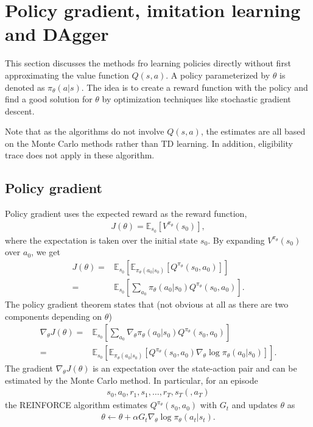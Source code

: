 \documentclass[onecolumn, 12pt]{IEEEtran}
\newcommand\EE[2]{\mathbb{E}_{#1}\left[#2\right]}
\newcommand\1[1]{\mathbb{I}_{\left\{#1\right\}}}
\begin{document}
\section{Policy gradient, imitation learning and DAgger}

This section discusses the methods fro learning policies directly without first approximating the value function $Q(s, a)$. A policy parameterized by $\theta$ is denoted as $\pi_\theta(a|s)$. The idea is to create a reward function with the policy and find a good solution for $\theta$ by optimization techniques like stochastic gradient descent.

Note that as the algorithms do not involve $Q(s, a)$, the estimates are all based on the Monte Carlo methods rather than TD learning. In addition, eligibility trace does not apply in these algorithm. 

\subsection{Policy gradient}

Policy gradient uses the expected reward as the reward function,
\begin{align*}
  J(\theta) = \EE{s_0}{V^{\pi_\theta}(s_0)},
\end{align*}
where the expectation is taken over the initial state $s_0$. By expanding $V^{\pi_\theta}(s_0)$ over $a_0$, we get
\begin{align*}
  J(\theta) =& \EE{s_0}{\EE{\pi_{\theta}(a_0|s_0)}{Q^{\pi_\theta}(s_0, a_0)}}\\
  =& \EE{s_0}{\sum_{a_0}{\pi_{\theta}(a_0|s_0)Q^{\pi_\theta}(s_0, a_0)}}.
\end{align*}
The policy gradient theorem states that (not obvious at all as there are two components depending on $\theta$)
\begin{align*}
  \nabla_\theta J(\theta) =& \EE{s_0}{\sum_{a_0}{\nabla_\theta\pi_{\theta}(a_0|s_0)Q^{\pi_\theta}(s_0, a_0)}}\\
  =& \EE{s_0}{\EE{\pi_{\theta}(a_0|s_0)}{Q^{\pi_\theta}(s_0, a_0)\nabla_\theta\log\pi_\theta(a_0|s_0)}}.
\end{align*}
The gradient $\nabla_\theta J(\theta)$ is an expectation over the state-action pair and can be estimated by the Monte Carlo method. In particular, for an episode
\begin{align*}
  s_0, a_0, r_1, s_1, \dots, r_T, s_T(, a_T)
\end{align*}
the REINFORCE algorithm estimates $Q^{\pi_\theta}(s_0, a_0)$ with $G_t$ and updates $\theta$ as
\begin{align*}
  \theta \leftarrow \theta + \alpha G_t\nabla_\theta\log\pi_\theta(a_t|s_t).
\end{align*}
\end{document}
